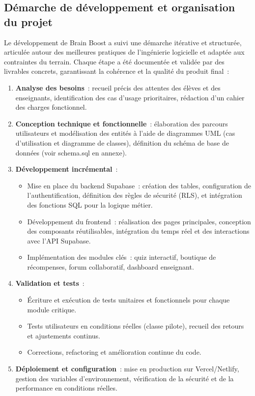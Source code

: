 \documentclass[a4paper,11pt]{report}
\begin{document}
\subsection{Démarche de développement et organisation du projet}
Le développement de Brain Boost a suivi une démarche itérative et structurée, articulée autour des meilleures pratiques de l'ingénierie logicielle et adaptée aux contraintes du terrain. Chaque étape a été documentée et validée par des livrables concrets, garantissant la cohérence et la qualité du produit final :
\begin{enumerate}
    \item \textbf{Analyse des besoins} : recueil précis des attentes des élèves et des enseignants, identification des cas d'usage prioritaires, rédaction d'un cahier des charges fonctionnel.
    \item \textbf{Conception technique et fonctionnelle} : élaboration des parcours utilisateurs et modélisation des entités à l'aide de diagrammes UML (cas d'utilisation et diagramme de classes), définition du schéma de base de données (voir schema.sql en annexe).
    \item \textbf{Développement incrémental} :
    \begin{itemize}
        \item Mise en place du backend Supabase : création des tables, configuration de l'authentification, définition des règles de sécurité (RLS), et intégration des fonctions SQL pour la logique métier.
        \item Développement du frontend : réalisation des pages principales, conception des composants réutilisables, intégration du temps réel et des interactions avec l'API Supabase.
        \item Implémentation des modules clés : quiz interactif, boutique de récompenses, forum collaboratif, dashboard enseignant.
    \end{itemize}
    \item \textbf{Validation et tests} :
    \begin{itemize}
        \item Écriture et exécution de tests unitaires et fonctionnels pour chaque module critique.
        \item Tests utilisateurs en conditions réelles (classe pilote), recueil des retours et ajustements continus.
        \item Corrections, refactoring et amélioration continue du code.
    \end{itemize}
    \item \textbf{Déploiement et configuration} : mise en production sur Vercel/Netlify, gestion des variables d'environnement, vérification de la sécurité et de la performance en conditions réelles.
\end{enumerate}
\end{document}

